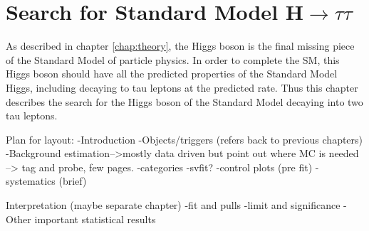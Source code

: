 \chapter{Search for Standard Model H$\rightarrow\tau\tau$}
\label{chap:httSM}

As described in chapter \ref{chap:theory}, the Higgs boson is the final missing 
piece of the Standard Model of particle physics. In order to complete the SM, 
this Higgs boson should have all the predicted properties of the Standard Model
Higgs, including decaying to tau leptons at the predicted rate. Thus this
chapter describes the search for the Higgs boson of the Standard Model 
decaying into two tau leptons.

Plan for layout:
-Introduction
-Objects/triggers (refers back to previous chapters)
-Background estimation-->mostly data driven but point out where MC is needed -->
tag and probe, few pages.
-categories
-svfit?
-control plots (pre fit)
-systematics (brief)

Interpretation (maybe separate chapter)
-fit and pulls
-limit and significance
-Other important statistical results
